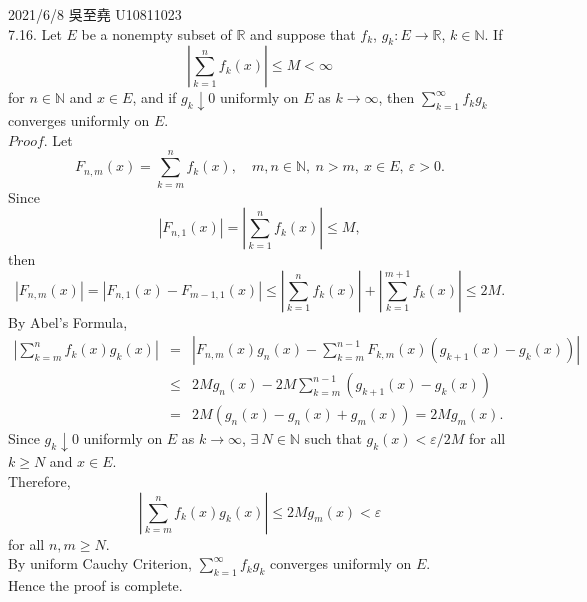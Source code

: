 \documentclass[12pt]{book}
\author{andersonwu2000}
\begin{document}
\begin{CJK}{UTF8}{bsmi}

\hfill 2021/6/8 吳至堯 U10811023 \\

7.16. Let $E$ be a nonempty subset of $\mathbb{R}$ and suppose that $f_k$, $g_k : E\rightarrow\mathbb{R}$, $k\in\mathbb{N}$. If 
\[
    \left| \sum_{k=1}^n f_k(x) \right| \le M < \infty
\]
for $n\in\mathbb{N}$ and $x\in E$, and if $g_k \downarrow 0$ uniformly on $E$ as $k\rightarrow\infty$, then $\sum_{k=1}^\infty f_kg_k$ converges uniformly on $E$. \\
$Proof$. Let
\[
    F_{n, m}(x) = \sum_{k=m}^n f_k(x),\quad m, n\in\mathbb{N},\ n>m,\ x\in E,\ \varepsilon>0.
\]
Since 
\[
    \left| F_{n, 1}(x) \right| = \left| \sum_{k=1}^n f_k(x) \right| \le M,
\]
then
\[
    \left| F_{n, m}(x) \right| 
    = \left| F_{n, 1}(x) - F_{m-1, 1}(x) \right| 
    \le \left| \sum_{k=1}^n f_k(x) \right| + \left| \sum_{k=1}^{m+1} f_k(x) \right| 
    \le 2M.
\]
By Abel's Formula, 
\begin{eqnarray*}
\left| \sum_{k=m}^n f_k(x)g_k(x) \right|
    & = & \left| F_{n, m}(x)g_n(x) - \sum_{k=m}^{n-1} F_{k, m}(x)(g_{k+1}(x)-g_k(x)) \right| \\
    &\le& 2Mg_n(x) - 2M\sum_{k=m}^{n-1} (g_{k+1}(x)-g_k(x)) \\
    & = & 2M (g_n(x)-g_n(x)+g_m(x)) = 2Mg_m(x).
\end{eqnarray*}
Since $g_k \downarrow 0$ uniformly on $E$ as $k\rightarrow\infty$, $\exists\ N\in\mathbb{N}$ such that $g_k(x)<\varepsilon/2M$ for all $k\ge N$ and $x\in E$. \\
Therefore, 
\[
    \left| \sum_{k=m}^n f_k(x)g_k(x) \right| \le 2Mg_m(x) < \varepsilon
\]
for all $n, m\ge N$. \\
By uniform Cauchy Criterion, $\sum_{k=1}^\infty f_kg_k$ converges uniformly on $E$. \\
Hence the proof is complete. \\


\end{CJK}
\end{document}
